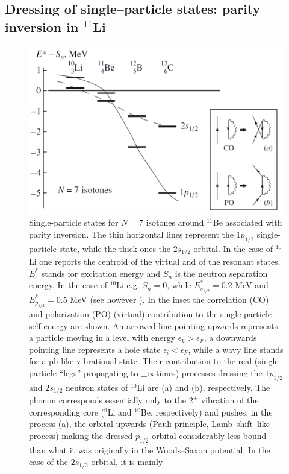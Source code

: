 \subsection{Dressing of single--particle states: parity inversion in $^{11}$Li}\label{C6S2.2x}
 \begin{figure}
 \centerline{\includegraphics*[width=12 cm,angle=0]{C6/figs_C6/fig6_2_4.pdf}}
\caption{Single-particle states for $N = 7$ isotones around $^{11}$Be associated with parity inversion. The thin horizontal lines
represent the $1p_{1/2}$ single-particle state, while the thick ones the $2s_{1/2}$ orbital. In the case of $^{10}$Li one reports the centroid of
the virtual and of the resonant states. $E^*$ stands for excitation energy and $S_n$ is the neutron separation energy. In the case
of $^{10}$Li e.g. $S_n = 0$, while $E^*_{s_{1/2}} = 0.2$ MeV and $E^*_{p_{1/2}} = 0.5$ MeV (see however \cite{Cavallaro:17}). In the inset the correlation (CO) and polarization (PO)
(virtual) contribution to the single-particle self-energy are shown. An arrowed line pointing upwards represents a particle
moving in a level with energy $\epsilon_k > \epsilon_F$, a downwards pointing line represents a hole state $\epsilon_i < \epsilon_F$, while a wavy line stands for
a ph-like vibrational state. Their contribution to the real (single-particle ``legs'' propagating to $\pm\infty$times) processes dressing
the $1p_{1/2}$ and $2s_{1/2}$ neutron states of $^{10}$Li  are (a) and (b), respectively.  The phonon corresponds
essentially only to the $2^+$ vibration of the corresponding core ($^9$Li and $^{10}$Be, respectively) and pushes, in the process (a), the orbital upwards
(Pauli principle, Lamb--shift--like process) making the dressed $p_{1/2}$ orbital considerably less bound than what it was originally
in the Woods--Saxon potential. In the case of the $2s_{1/2}$ orbital, it is mainly
}
\end{figure}
